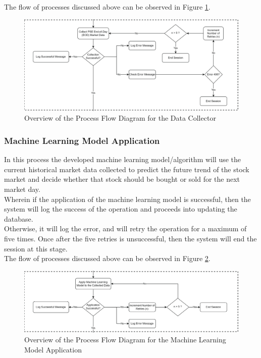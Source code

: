 The flow of processes discussed above can be observed in Figure \ref{fig:process_flowchart_data_collector}.

\begin{figure}[ht]
    \centering
    \includegraphics[width=1\textwidth]{./assets/ProcessFlowchart-02.png}
    \caption{Overview of the Process Flow Diagram for the Data Collector}
    \label{fig:process_flowchart_data_collector}
\end{figure}
\FloatBarrier

\subsubsection{Machine Learning Model Application}
\label{subsubsec:ml_application}
In this process the developed machine learning model/algorithm will use the 
current historical market data collected to predict the future trend of the 
stock market and decide whether that stock should be bought or sold for 
the next market day.
\hfill \\

Wherein if the application of the machine learning model is successful, 
then the system will log the success of the operation and proceeds into 
updating the database.
\hfill \\

Otherwise, it will log the error, and will retry the operation for a 
maximum of five times. Once after the five retries is unsuccessful, 
then the system will end the session at this stage.
\hfill \\

The flow of processes discussed above can be 
observed in Figure \ref{fig:process_flowchart_ml_application}.

\begin{figure}[ht]
    \centering
    \includegraphics[width=1\textwidth]{./assets/ProcessFlowchart-03.png}
    \caption{Overview of the Process Flow Diagram for the Machine Learning Model Application}
    \label{fig:process_flowchart_ml_application}
\end{figure}
\FloatBarrier


